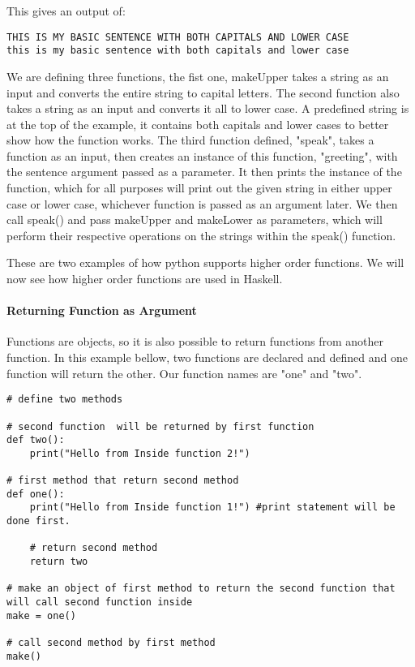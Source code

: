 \documentclass{article}
\begin{document}
This gives an output of:
\begin{lstlisting}
THIS IS MY BASIC SENTENCE WITH BOTH CAPITALS AND LOWER CASE
this is my basic sentence with both capitals and lower case
\end{lstlisting}
We are defining three functions, the fist one, makeUpper takes a string as an input and converts the entire string to capital letters. The second function also takes a string as an input and converts it all to lower case. A predefined string is at the top of the example, it contains both capitals and lower cases to better show how the function works. The third function defined, "speak", takes a function as an input, then creates an instance of this function, "greeting", with the sentence argument passed as a parameter. It then prints the instance of the function, which for all purposes will print out the given string in either upper case or lower case, whichever function is passed as an argument later. We then call speak() and pass makeUpper and makeLower as parameters, which will perform their respective operations on the strings within the speak() function.


These are two examples of how python supports higher order functions. We will now see how higher order functions are used in Haskell.



\paragraph{Returning Function as Argument}
Functions are objects, so it is also possible to return functions from another function. In this example bellow, two functions are declared and defined and one function will return the other. Our function names are "one" and "two".

\begin{lstlisting}
# define two methods

# second function  will be returned by first function
def two():
    print("Hello from Inside function 2!")

# first method that return second method
def one():
    print("Hello from Inside function 1!") #print statement will be done first.

    # return second method
    return two

# make an object of first method to return the second function that will call second function inside
make = one()

# call second method by first method
make()

\end{lstlisting}
\end{document}
